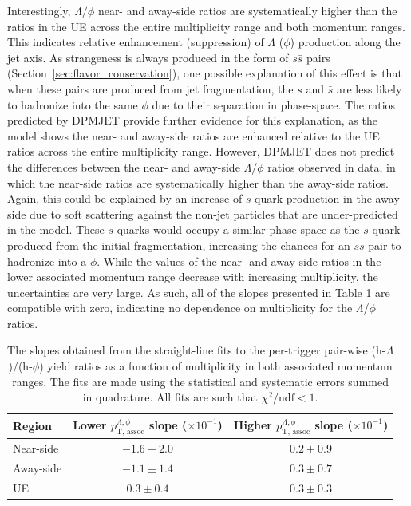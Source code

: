 Interestingly, $\Lambda/\phi$ near- and away-side ratios are systematically higher than the ratios in the UE across the entire multiplicity range and both momentum ranges. This indicates relative enhancement (suppression) of $\Lambda$ ($\phi$) production along the jet axis. As strangeness is always produced in the form of $s\bar{s}$ pairs (Section~\ref{sec:flavor_conservation}), one possible explanation of this effect is that when these pairs are produced from jet fragmentation, the $s$ and $\bar{s}$ are less likely to hadronize into the same $\phi$ due to their separation in phase-space. The ratios predicted by DPMJET provide further evidence for this explanation, as the model shows the near- and away-side ratios are enhanced relative to the UE ratios across the entire multiplicity range. However, DPMJET does not predict the differences between the near- and away-side $\Lambda$/$\phi$ ratios observed in data, in which the near-side ratios are systematically higher than the away-side ratios. Again, this could be explained by an increase of $s$-quark production in the away-side due to soft scattering against the non-jet particles that are under-predicted in the model. These $s$-quarks would occupy a similar phase-space as the $s$-quark produced from the initial fragmentation, increasing the chances for an $s\bar{s}$ pair to hadronize into a $\phi$. While the values of the near- and away-side ratios in the lower associated momentum range decrease with increasing multiplicity, the uncertainties are very large. As such, all of the slopes presented in Table \ref{tab:lambda_phi_slopes} are compatible with zero, indicating no dependence on multiplicity for the $\Lambda$/$\phi$ ratios.

\begin{table}
\centering
\caption{The slopes obtained from the straight-line fits to the per-trigger pair-wise (h-$\Lambda$)/(h-$\phi$) yield ratios as a function of multiplicity in both associated momentum ranges. The fits are made using the statistical and systematic errors summed in quadrature. All fits are such that $\chi^{2}/\text{ndf} < 1$.}
\begin{tabular}{l c c}
\hline
Region & Lower $p_{\text{T, assoc}}^{\Lambda, \phi}$ slope ($\times10^{-1}$) & Higher $p_{\text{T, assoc}}^{\Lambda, \phi}$ slope ($\times10^{-1}$) \\
\hline
Near-side & $ -1.6\pm 2.0$ & $0.2 \pm 0.9$ \\
Away-side & $ -1.1 \pm 1.4$ & $0.3 \pm 0.7$ \\
UE & $0.3 \pm 0.4$ & $0.3 \pm 0.3$ \\
\hline
\end{tabular}
\label{tab:lambda_phi_slopes}
\end{table}